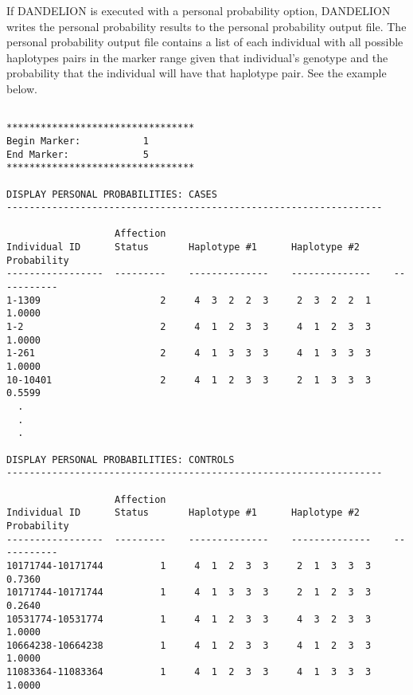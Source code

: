 If DANDELION is executed with a personal probability option, DANDELION writes
the personal probability results to the personal probability output file.  The
personal probability output file contains a list of each individual with all
possible haplotypes pairs in the marker range given that individual's genotype
and the probability that the individual will have that haplotype pair.  See the
example below.

\begin{verbatim}

*********************************
Begin Marker:           1
End Marker:             5
*********************************

DISPLAY PERSONAL PROBABILITIES: CASES
------------------------------------------------------------------

                   Affection
Individual ID      Status       Haplotype #1      Haplotype #2      Probability
-----------------  ---------    --------------    --------------    -----------
1-1309                     2     4  3  2  2  3     2  3  2  2  1         1.0000
1-2                        2     4  1  2  3  3     4  1  2  3  3         1.0000
1-261                      2     4  1  3  3  3     4  1  3  3  3         1.0000
10-10401                   2     4  1  2  3  3     2  1  3  3  3         0.5599
  .
  .
  .

DISPLAY PERSONAL PROBABILITIES: CONTROLS
------------------------------------------------------------------

                   Affection
Individual ID      Status       Haplotype #1      Haplotype #2      Probability
-----------------  ---------    --------------    --------------    -----------
10171744-10171744          1     4  1  2  3  3     2  1  3  3  3         0.7360
10171744-10171744          1     4  1  3  3  3     2  1  2  3  3         0.2640
10531774-10531774          1     4  1  2  3  3     4  3  2  3  3         1.0000
10664238-10664238          1     4  1  2  3  3     4  1  2  3  3         1.0000
11083364-11083364          1     4  1  2  3  3     4  1  3  3  3         1.0000
\end{verbatim}

